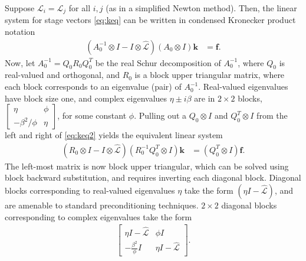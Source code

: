 \documentclass[review]{siamart}
\begin{document}
Suppose $\mathcal{L}_i = \mathcal{L}_j$ for all $i,j$ (as in a simplified Newton method).
Then, the linear system for stage vectors \eqref{eq:keq} can be written in condensed
Kronecker product notation
%
\begin{align}\label{eq:keq2}
\left( A_0^{-1}\otimes I - I\otimes\widehat{\mathcal{L}}\right)
	(A_0\otimes I) \mathbf{k} & = \mathbf{f}.
\end{align}
%
Now, let $A_0^{-1} = Q_0R_0Q_0^T$ be the real Schur decomposition of $A_0^{-1}$, where
$Q_0$ is real-valued and orthogonal, and $R_0$ is a block
upper triangular matrix, where each block corresponds to an eigenvalue (pair) of
$A_0^{-1}$. Real-valued eigenvalues have block size one, and complex eigenvalues
$\eta\pm i\beta$ are in $2\times 2$ blocks,
$\begin{bmatrix} \eta & \phi \\-\beta^2/\phi & \eta\end{bmatrix}$, for some
constant $\phi$.
Pulling out a $Q_0\otimes I$ and $Q_0^T\otimes I$ from the left and right of
\eqref{eq:keq2} yields the equivalent linear system
%
\begin{align}\label{eq:keq3}
\left( R_0\otimes I - I \otimes \widehat{\mathcal{L}}\right)
	(R_0^{-1}Q_0^T\otimes I) \mathbf{k} & = (Q_0^T\otimes I)\mathbf{f}.
\end{align}
%
The left-most matrix is now block upper triangular, which can be solved
using block backward substitution, and requires inverting each diagonal block.
Diagonal blocks corresponding to real-valued eigenvalues $\eta$ take the form
$(\eta I - \widehat{\mathcal{L}})$, and are amenable to standard preconditioning
techniques. $2\times 2$ diagonal blocks corresponding to complex eigenvalues
take the form
%
\begin{align}\label{eq:block}
\begin{bmatrix} \eta I - \widehat{\mathcal{L}} & \phi I\\
-\frac{\beta^2}{\phi} I & \eta I - \widehat{\mathcal{L}}\end{bmatrix}.
\end{align}
%
\end{document}

